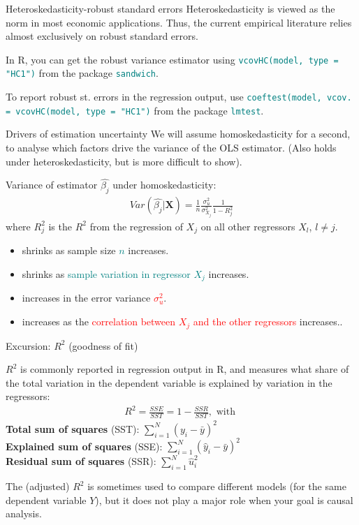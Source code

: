 \documentclass[11pt, aspectratio = 169]{beamer}
\begin{document}
\begin{frame}{Heteroskedasticity-robust standard errors}
Heteroskedasticity is viewed as the norm in most economic applications. Thus, the current empirical literature relies almost exclusively on robust standard errors. 

In R, you can get the robust variance estimator using \textcolor{teal}{\texttt{vcovHC(model, type = "HC1")}} from the package \textcolor{teal}{\texttt{sandwich}}.

To report robust st. errors in the regression output, use \textcolor{teal}{\texttt{coeftest(model, vcov. = vcovHC(model, type = "HC1")}} from the package \textcolor{teal}{\texttt{lmtest}}.
\end{frame}


\begin{frame}{Drivers of estimation uncertainty}
We will assume homoskedasticity for a second, to analyse which factors drive the variance of the OLS estimator.
(Also holds under heteroskedasticity, but is more difficult to show).

Variance of estimator $\hat{\beta_j}$ under homoskedasticity:
\begin{align*}
    Var(\hat{\beta_j}|\mathbf{X}) = \frac{1}{n} \frac{\sigma_u^2}{\sigma_{X_j}^2}\frac{1}{1-R_j^2}
\end{align*}
where $R_j^2$ is the $R^2$ from the regression of $X_j$ on all other regressors $X_l$, $l \neq j$.

  \begin{itemize}
     \item shrinks as sample size \textcolor{teal}{$n$} increases.
     \item shrinks as \textcolor{teal}{sample variation in regressor $X_j$} increases.
     \item increases in the error variance \textcolor{red}{$\sigma_u^2$}.
    \item increases as the \textcolor{red}{correlation between $X_j$ and the other regressors} increases..
 \end{itemize}
\end{frame}


\begin{frame}{Excursion: $R^2$ (goodness of fit)}

$R^2$ is commonly reported in regression output in R, and measures what share of the total variation in the dependent variable is explained by variation in the regressors:
\begin{align*}
 R^2=\frac{SSE}{SST}=1-\frac{SSR}{SST}, \text{ with }
 \end{align*}
\textbf{Total sum of squares} (SST): $\sum_{i=1}^N (y_i - \bar{y})^2$\\
\textbf{Explained sum of squares} (SSE): $\sum_{i=1}^N (\hat{y}_i - \bar{y})^2$\\
\textbf{Residual sum of squares} (SSR): $\sum_{i=1}^N \hat{u}_i^2$


The (adjusted) $R^2$ is sometimes used to compare different models (for the same dependent variable $Y$), but it does not play a major role when your goal is causal analysis.
\end{frame}
\end{document}
